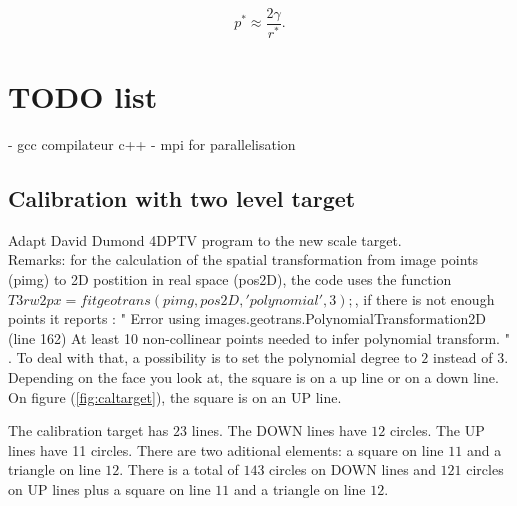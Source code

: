 \documentclass[lineno]{jfm}
\begin{document}

% 
% 
\begin{equation}
p^{*}\approx \frac{2\gamma}{r^{*}}.\label{eq:ppit}
\end{equation}

\section{TODO list}

- gcc compilateur c++
- mpi for parallelisation

\subsection{Calibration with two level target}

Adapt David Dumond 4DPTV program to the new scale target.\\

Remarks: for the calculation of the spatial transformation from image points (pimg) to 2D postition in real space (pos2D), the code uses the function $T3rw2px  = fitgeotrans(pimg,pos2D,'polynomial',3);$, if there is not enough points it reports : " Error using images.geotrans.PolynomialTransformation2D (line 162)
At least 10 non-collinear points needed to infer polynomial transform. " . To deal with that, a possibility is to set the polynomial degree to $2$ instead of $3$.\\

Depending on the face you look at, the square is on a up line or on a down line. On figure (\ref{fig:caltarget}), the square is on an UP line.

The calibration target has $23$ lines. The DOWN lines have $12$ circles. The UP lines have 11 circles. There are two aditional elements: a square on line $11$ and a triangle on line $12$. There is a total of $143$ circles on DOWN lines and $121$ circles on UP lines plus a square on line $11$ and a triangle on line $12$. \\
\end{document}
